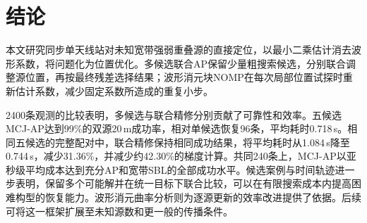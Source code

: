 \section{结论}\label{sec:conclusion}
本文研究同步单天线站对未知宽带强弱重叠源的直接定位，以最小二乘估计消去波形系数，将问题化为位置优化。多候选联合AP保留少量粗搜索候选，分别联合调整源位置，再按最终残差选择结果；波形消元块NOMP在每次局部位置试探时重新估计系数，减少固定系数所造成的重复小步。

2400条观测的比较表明，多候选与联合精修分别贡献了可靠性和效率。五候选MCJ-AP达到99\%的双源20\,m成功率，相对单候选恢复96条，平均耗时0.718\,s。相同五候选的完整配对中，联合精修保持相同成功结果，将平均耗时从1.084\,s降至0.744\,s，减少31.36\%，并减少约42.30\%的梯度计算。共同240条上，MCJ-AP以亚秒级平均成本达到充分AP和宽带SBL的全部成功水平。候选案例与时间轨迹进一步表明，保留多个可能解并在统一目标下联合比较，可以在有限搜索成本内提高困难构型的恢复能力。波形消元曲率分析则为逐源更新的效率改进提供了依据。后续可将这一框架扩展至未知源数和更一般的传播条件。
